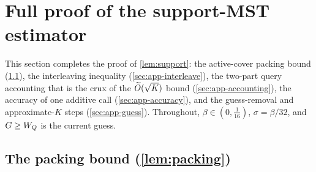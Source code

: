 \section{Full proof of the support-MST estimator}\label{sec:app-lemma3}

This section completes the proof of \cref{lem:support}: the active-cover packing bound
(\cref{sec:app-packing}), the interleaving inequality (\cref{sec:app-interleave}), the two-part query
accounting that is the crux of the $\widetilde{O}(\sqrt K)$ bound (\cref{sec:app-accounting}), the accuracy of one
additive call (\cref{sec:app-accuracy}), and the guess-removal and approximate-$K$ steps
(\cref{sec:app-guess}). Throughout, $\beta\in(0,\tfrac1{16})$, $\sigma=\beta/32$, and $G\ge W_Q$ is the
current guess.

\subsection{The packing bound (\texorpdfstring{\cref{lem:packing}}{packing})}\label{sec:app-packing}

